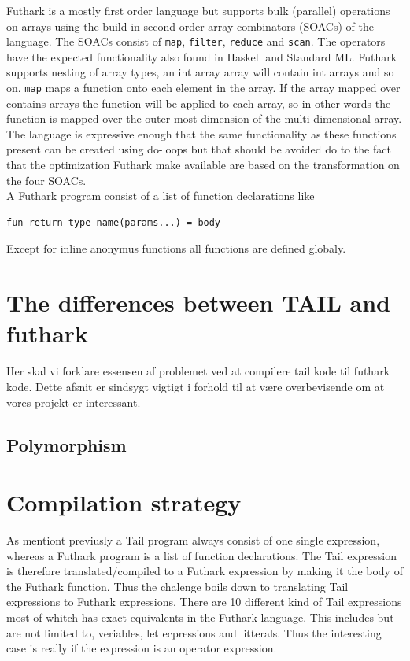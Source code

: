 \documentclass[11pt]{article}
\begin{document}
Futhark is a mostly first order language but supports bulk (parallel) operations on arrays
using the build-in second-order array combinators (SOACs) of the language. 
The SOACs consist of {\tt map}, {\tt filter}, {\tt reduce} and {\tt scan}.
The operators have the expected functionality also found in Haskell and Standard ML.
Futhark supports nesting of array types, an int array array will contain int arrays and so on.
{\tt map} maps a function onto each element in the array.
If the array mapped over contains arrays the function will be applied to each array,
so in other words the function is mapped over the outer-most dimension of the multi-dimensional array.
The language is expressive enough that the same functionality as these functions present can be created using do-loops
but that should be avoided do to the fact that the optimization Futhark make available are based on the
transformation on the four SOACs. \\


A Futhark program consist of a list of function declarations like
\begin{lstlisting}[numbers=none,frame=none]
fun return-type name(params...) = body
\end{lstlisting}

Except for inline anonymus functions all functions are defined globaly. 

\newpage
\section{The differences between TAIL and futhark}

Her skal vi forklare essensen af problemet ved at compilere tail kode til futhark kode. Dette afsnit er sindsygt vigtigt i forhold til at være overbevisende om at vores projekt er interessant. 

\subsection{Polymorphism}

\section{Compilation strategy}
As mentiont previusly a Tail program always consist of one single expression, whereas a Futhark program is a list of function declarations. The Tail expression is therefore translated/compiled to a Futhark expression by making it the body of the Futhark function. 
Thus the chalenge boils down to translating Tail expressions to Futhark expressions. 
There are 10 different kind of Tail expressions most of whitch has exact equivalents in the Futhark language. This includes but are not limited to, veriables, let ecpressions and litterals. Thus the interesting case is really if the expression is an operator expression. \\
\end{document}
